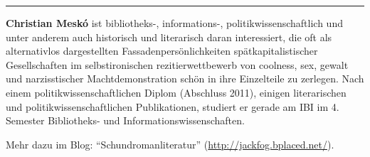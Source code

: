 \begin{center}\rule{0.5\linewidth}{\linethickness}\end{center}

\textbf{Christian Meskó} ist bibliotheks-, informations-,
politikwissenschaftlich und unter anderem auch historisch und
literarisch daran interessiert, die oft als alternativlos dargestellten
Fassadenpersönlichkeiten spätkapitalistischer Gesellschaften im
selbstironischen rezitierwettbewerb von coolness, sex, gewalt und
narzisstischer Machtdemonstration schön in ihre Einzelteile zu zerlegen.
Nach einem politikwissenschaftlichen Diplom (Abschluss 2011), einigen
literarischen und politikwissenschaftlichen Publikationen, studiert er
gerade am IBI im 4. Semester Bibliotheks- und
Informationswissenschaften.

Mehr dazu im Blog: ``Schundromanliteratur''
(\url{http://jackfog.bplaced.net/}).
